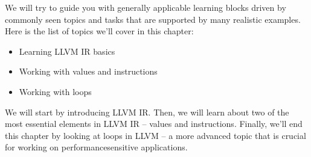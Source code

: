 We will try to guide you with generally applicable learning blocks driven by commonly seen topics and tasks that are supported by many realistic examples. Here is the list of topics we'll cover in this chapter:

\begin{itemize}
\item Learning LLVM IR basics
\item Working with values and instructions
\item Working with loops
\end{itemize}

We will start by introducing LLVM IR. Then, we will learn about two of the most essential elements in LLVM IR – values and instructions. Finally, we'll end this chapter by looking at loops in LLVM – a more advanced topic that is crucial for working on performancesensitive applications.
























